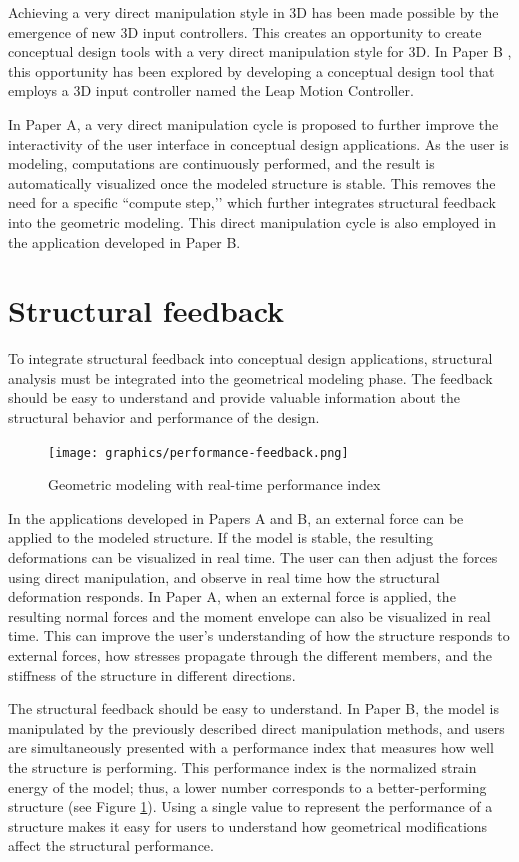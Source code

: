 Achieving a very direct manipulation style in 3D has been made possible by the emergence of new 3D input controllers. This creates an opportunity to create conceptual design tools with a very direct manipulation style for 3D. In Paper B , this opportunity has been explored by developing a conceptual design tool that employs a 3D input controller named the Leap Motion Controller. 

In Paper A, a very direct manipulation cycle is proposed to further improve the interactivity of the user interface in conceptual design applications. As the user is modeling, computations are continuously performed, and the result is automatically visualized once the modeled structure is stable. This removes the need for a specific ``compute step,’’ which further integrates structural feedback into the geometric modeling. This direct manipulation cycle is also employed in the application developed in Paper B.

\section{Structural feedback}
To integrate structural feedback into conceptual design applications, structural analysis must be integrated into the geometrical modeling phase. The feedback should be easy to understand and provide valuable information about the structural behavior and performance of the design.

\begin{figure}
  \texttt{[image: graphics/performance-feedback.png]}
  \caption{Geometric modeling with real-time performance index}
  \label{fig:performance-feedback}
\end{figure}

In the applications developed in Papers A and B, an external force can be applied to the modeled structure. If the model is stable, the resulting deformations can be visualized in real time. The user can then adjust the forces using direct manipulation, and observe in real time how the structural deformation responds. In Paper A, when an external force is applied, the resulting normal forces and the moment envelope can also be visualized in real time. This can improve the user’s understanding of how the structure responds to external forces, how stresses propagate through the different members, and the stiffness of the structure in different directions.

The structural feedback should be easy to understand. In Paper B, the model is manipulated by the previously described direct manipulation methods, and users are simultaneously presented with a performance index that measures how well the structure is performing. This performance index is the normalized strain energy of the model; thus, a lower number corresponds to a better-performing structure (see Figure \ref{fig:performance-feedback}). Using a single value to represent the performance of a structure makes it easy for users to understand how geometrical modifications affect the structural performance.


